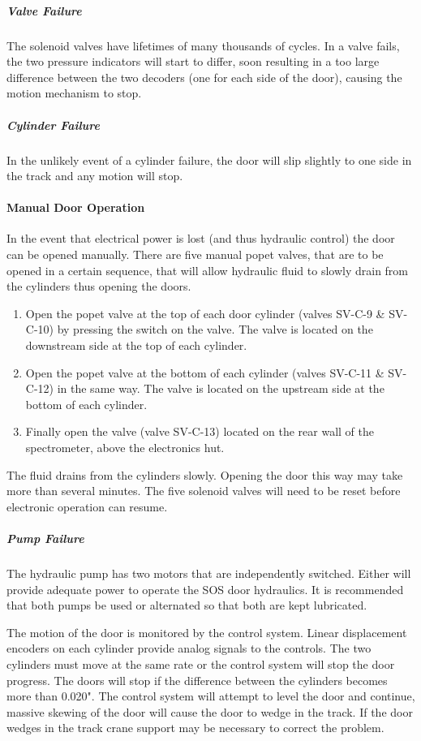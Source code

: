 \begin{obsolete}
\subparagraph{Valve Failure}

The solenoid valves have lifetimes of many thousands of cycles.
In a valve fails, the two pressure indicators will start to differ, soon
resulting in a too large difference between the two decoders (one for each
side of the door), causing the motion mechanism to stop.

\subparagraph{Cylinder Failure}

In the unlikely event of a cylinder failure, the door will slip slightly to one
side in the track and any motion will stop.

\paragraph{Manual Door Operation}

In the event that electrical power is lost (and thus hydraulic control) the
door can be opened manually. There are five manual popet valves, that are
to be opened in a certain sequence, that will allow hydraulic fluid to slowly
drain from the cylinders thus opening the doors.

\begin{enumerate}
\item{Open the popet valve at the top of each door cylinder (valves SV-C-9
\& SV-C-10) by
pressing the switch on the valve. The valve is located on the downstream
side at the top of each cylinder.}
\item{Open the popet valve at the bottom of each cylinder (valves SV-C-11
\& SV-C-12) in
the same way. The valve is located on the upstream side at the bottom of
each cylinder.}
\item{Finally open the valve (valve SV-C-13) located on the rear wall of the
spectrometer, above the electronics hut.}
\end{enumerate}

The fluid drains from the cylinders slowly. Opening the door this way may
take more than several minutes. The five solenoid valves will need to be
reset before electronic operation can resume.

\subparagraph{Pump Failure}

The hydraulic pump has two motors that are independently switched.
Either will provide adequate power to operate the SOS door hydraulics. It
is recommended that both pumps be used or alternated so that both are kept
lubricated.

The motion of the door is monitored by the control system. Linear
displacement encoders on each cylinder provide analog signals to the controls.
The two cylinders must move at the same rate or the control system will
stop the door progress. The doors will stop if the difference between the
cylinders becomes more than 0.020". The control system will attempt to
level the door and continue, massive skewing of the door will cause the
door to wedge in the track. If the door wedges in the track crane support
may be necessary to correct the problem.



\end{obsolete}
